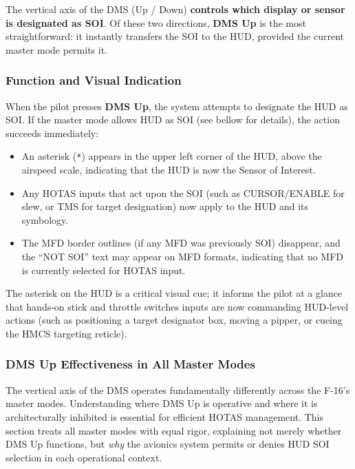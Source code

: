 \documentclass[11pt,a4paper]{article}
\begin{document}
The vertical axis of the DMS (Up / Down) \textbf{controls which display or sensor is designated as SOI}. Of these two directions, \textbf{DMS Up} is the most straightforward: it instantly transfers the SOI to the HUD, provided the current master mode permits it.

\subsubsection{Function and Visual Indication}

When the pilot presses \textbf{DMS Up}, the system attempts to designate the HUD as SOI. If the master mode allows HUD as SOI (see bellow for details), the action succeeds immediately:

\begin{itemize}

\item An asterisk (\texttt{*}) appears in the upper left corner of the HUD, above the airspeed scale, indicating that the HUD is now the Sensor of Interest.

\item Any HOTAS inputs that act upon the SOI (such as CURSOR/ENABLE for slew, or TMS for target designation) now apply to the HUD and its symbology.

\item The MFD border outlines (if any MFD was previously SOI) disappear, and the ``NOT SOI'' text may appear on MFD formats, indicating that no MFD is currently selected for HOTAS input.

\end{itemize}

The asterisk on the HUD is a critical visual cue; it informs the pilot at a glance that hands-on stick and throttle switches inputs are now commanding HUD-level actions (such as positioning a target designator box, moving a pipper, or cueing the HMCS targeting reticle).

\subsubsection{DMS Up Effectiveness in All Master Modes}

The vertical axis of the DMS operates fundamentally differently across the F-16's master modes. Understanding where DMS Up is operative and where it is architecturally inhibited is essential for efficient HOTAS management. This section treats all master modes with equal rigor, explaining not merely whether DMS Up functions, but \textit{why} the avionics system permits or denies HUD SOI selection in each operational context.
\end{document}
